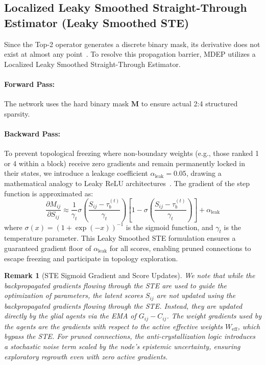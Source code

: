 \documentclass[letterpaper]{article} %
\newtheorem{remark}{Remark}
\begin{document}
\subsection{Localized Leaky Smoothed Straight-Through Estimator (Leaky Smoothed STE)}\label{subsec:ste}

Since the Top-2 operator generates a discrete binary mask, its derivative does not exist at almost any point~\cite{bengio2013estimating}. To resolve this propagation barrier, MDEP utilizes a Localized Leaky Smoothed Straight-Through Estimator.

\paragraph{Forward Pass:} The network uses the hard binary mask $\bm{M}$ to ensure actual 2:4 structured sparsity.

\paragraph{Backward Pass:} To prevent topological freezing where non-boundary weights (e.g., those ranked 1 or 4 within a block) receive zero gradients and remain permanently locked in their states, we introduce a leakage coefficient $\alpha_{\text{leak}} = 0.05$, drawing a mathematical analogy to Leaky ReLU architectures~\cite{maas2013rectifier}. The gradient of the step function is approximated as:
\begin{equation}\label{eq:ste_grad}
    \frac{\partial M_{ij}}{\partial S_{ij}} \approx \frac{1}{\gamma_t} \sigma\!\left(\frac{S_{ij} - \tau_b^{(t)}}{\gamma_t}\right) \left[1 - \sigma\!\left(\frac{S_{ij} - \tau_b^{(t)}}{\gamma_t}\right)\right] + \alpha_{\text{leak}}
\end{equation}
where $\sigma(x) = (1 + \exp(-x))^{-1}$ is the sigmoid function, and $\gamma_t$ is the temperature parameter. This Leaky Smoothed STE formulation ensures a guaranteed gradient floor of $\alpha_{\text{leak}}$ for all scores, enabling pruned connections to escape freezing and participate in topology exploration.

\begin{remark}[STE Sigmoid Gradient and Score Updates]
We note that while the backpropagated gradients flowing through the STE are used to guide the optimization of parameters, the latent scores $S_{ij}$ are not updated using the backpropagated gradients flowing through the STE. Instead, they are updated directly by the glial agents via the EMA of $G_{ij} - C_{ij}$. The weight gradients used by the agents are the gradients with respect to the active effective weights $W_{\text{eff}}$, which bypass the STE. For pruned connections, the anti-crystallization logic introduces a stochastic noise term scaled by the node's epistemic uncertainty, ensuring exploratory regrowth even with zero active gradients.
\end{remark}
\end{document}
